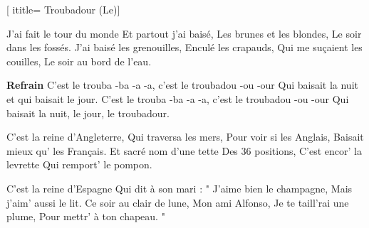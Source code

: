  [
ititle= {Troubadour (Le)}]

\beginverse
J'ai fait le tour du monde
Et partout j'ai baisé,
Les brunes et les blondes,
Le soir dans les fossés.
J'ai baisé les grenouilles,
Enculé les crapauds,
Qui me suçaient les couilles,
Le soir au bord de l'eau.
\endverse

\beginchorus
\textbf {Refrain}
C'est le trouba -ba -a -a, c'est le troubadou -ou -our
Qui baisait la nuit et qui baisait le jour.
C'est le trouba -ba -a -a, c'est le troubadou -ou -our
Qui baisait la nuit, le jour, le troubadour.
\endchorus

\beginverse
C'est la reine d'Angleterre,
Qui traversa les mers,
Pour voir si les Anglais,
Baisait mieux qu' les Français.
Et sacré nom d'une tette
Des 36 positions,
C'est encor' la levrette
Qui remport' le pompon.
\endverse

\begiverse
C'est la reine d'Espagne
Qui dit à son mari :
" J'aime bien le champagne,
Mais j'aim' aussi le lit.
Ce soir au clair de lune,
Mon ami Alfonso,
Je te taill'rai une plume,
Pour mettr' à ton chapeau. "
\endverse

\endsong